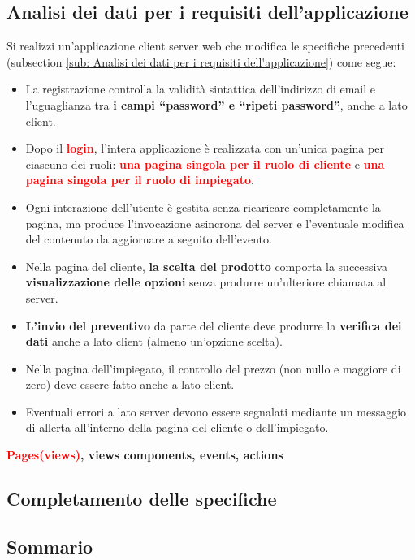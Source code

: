 \documentclass[a4paper, 12pt]{article}
\begin{document}
\subsection{Analisi dei dati per i requisiti dell'applicazione}
Si realizzi un’applicazione client server web che modifica le specifiche precedenti (subsection \ref{sub: Analisi dei dati per i requisiti dell'applicazione}) come segue:
\begin{itemize}
\item La registrazione controlla la validità sintattica dell’indirizzo di email e l’uguaglianza tra \textbf{\textcolor{myGreen}{i campi “password” e “ripeti password”}}, anche a lato client.
\item Dopo il \textbf{\textcolor{red}{login}}, l’intera applicazione è realizzata con un’unica pagina per ciascuno dei ruoli: \textbf{\textcolor{red}{una pagina singola per il ruolo di cliente}} e \textbf{\textcolor{red}{una pagina singola per il ruolo di impiegato}}.
\item Ogni interazione dell’utente è gestita senza ricaricare completamente la pagina, ma produce l’invocazione asincrona del server e l’eventuale modifica del contenuto da aggiornare a seguito dell’evento.
\item Nella pagina del cliente, \textbf{\textcolor{myBlue}{la scelta del prodotto}} comporta la successiva \textbf{\textcolor{myBrown}{visualizzazione delle opzioni}} senza produrre un’ulteriore chiamata al server.
\item \textbf{\textcolor{myBlue}{L’invio del preventivo}} da parte del cliente deve produrre la \textbf{\textcolor{myBrown}{verifica dei dati}} anche a lato client (almeno un’opzione scelta).
\item Nella pagina dell’impiegato, il controllo del prezzo (non nullo e maggiore di zero) deve essere fatto anche a lato client.
\item Eventuali errori a lato server devono essere segnalati mediante un messaggio di allerta all’interno della pagina del cliente o dell’impiegato.\\
\end{itemize}
\noindent \textbf{\textcolor{red}{Pages(views)}, \textcolor{myGreen}{views components}, \textcolor{myBlue}{events}, \textcolor{myBrown}{actions}}
\subsection{Completamento delle specifiche}
\subsection{Sommario}
\end{document}
